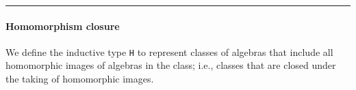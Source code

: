 \begin{center}\rule{0.5\linewidth}{\linethickness}\end{center}

\paragraph{Homomorphism closure}\label{homomorphism-closure}

We define the inductive type \texttt{H} to represent classes of algebras
that include all homomorphic images of algebras in the class; i.e.,
classes that are closed under the taking of homomorphic images.

\begin{code}%
\>[0]\<%
\\
\>[0]\<%
\\
\>[0]\AgdaSpace{}%
\AgdaSpace{}%
\AgdaSymbol{\{}\AgdaSpace{}%
\AgdaSpace{}%
\AgdaSymbol{:}\AgdaSpace{}%
\AgdaSymbol{\}(}\AgdaSpace{}%
\AgdaSymbol{:}\AgdaSpace{}%
\AgdaSpace{}%
\AgdaSymbol{(}\AgdaSpace{}%
\AgdaSpace{}%
\AgdaSymbol{)(}\AgdaSpace{}%
\AgdaSymbol{))}\AgdaSpace{}%
\AgdaSymbol{:}\AgdaSpace{}%
\AgdaSpace{}%
\AgdaSymbol{(}\AgdaSpace{}%
\AgdaSymbol{(}\AgdaSpace{}%
\AgdaSpace{}%
\AgdaSymbol{)}\AgdaSpace{}%
\AgdaSymbol{)(}\AgdaSpace{}%
\AgdaSymbol{(}\AgdaSpace{}%
\AgdaSpace{}%
\AgdaSymbol{))}\AgdaSpace{}%
\<%
\\
\>[0][@{}l@{\AgdaIndent{0}}]%
\>[2]\AgdaSpace{}%
\AgdaSymbol{:}\AgdaSpace{}%
\AgdaSymbol{\{}\AgdaSpace{}%
\AgdaSymbol{:}\AgdaSpace{}%
\AgdaSpace{}%
\AgdaSymbol{\AgdaUnderscore{}}\AgdaSpace{}%
\AgdaSymbol{\}}\AgdaSpace{}%
\AgdaSpace{}%
\AgdaSpace{}%
\AgdaSpace{}%
\AgdaSpace{}%
\AgdaSpace{}%
\AgdaSpace{}%
\AgdaSpace{}%
\AgdaSpace{}%
\AgdaSpace{}%
\AgdaSymbol{\{}\AgdaSymbol{\}\{}\AgdaSymbol{\}}\AgdaSpace{}%
\<%
\\
%
\>[2]\AgdaSpace{}%

\end{code}
